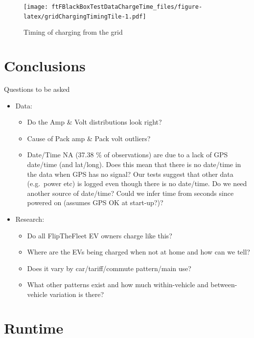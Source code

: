 \documentclass[]{article}
\providecommand{\tightlist}{%
  \setlength{\itemsep}{0pt}\setlength{\parskip}{0pt}}
\begin{document}
\begin{figure}
\centering
\texttt{[image: ftFBlackBoxTestDataChargeTime\_files/figure-latex/gridChargingTimingTile-1.pdf]}
\caption{\label{fig:gridChargingTimingTile}Timing of charging from the grid}
\end{figure}

\section{Conclusions}\label{conclusions}

Questions to be asked

\begin{itemize}
\tightlist
\item
  Data:

  \begin{itemize}
  \tightlist
  \item
    Do the Amp \& Volt distributions look right?
  \item
    Cause of Pack amp \& Pack volt outliers?
  \item
    Date/Time NA (37.38 \% of observations) are due to a lack of GPS
    date/time (and lat/long). Does this mean that there is no date/time
    in the data when GPS has no signal? Our tests suggest that other
    data (e.g.~power etc) is logged even though there is no date/time.
    Do we need another source of date/time? Could we infer time from
    seconds since powered on (assumes GPS OK at start-up?)?
  \end{itemize}
\item
  Research:

  \begin{itemize}
  \tightlist
  \item
    Do all FlipTheFleet EV owners charge like this?
  \item
    Where are the EVs being charged when not at home and how can we
    tell?
  \item
    Does it vary by car/tariff/commute pattern/main use?
  \item
    What other patterns exist and how much within-vehicle and
    between-vehicle variation is there?
  \end{itemize}
\end{itemize}

\section{Runtime}\label{runtime}
\end{document}
